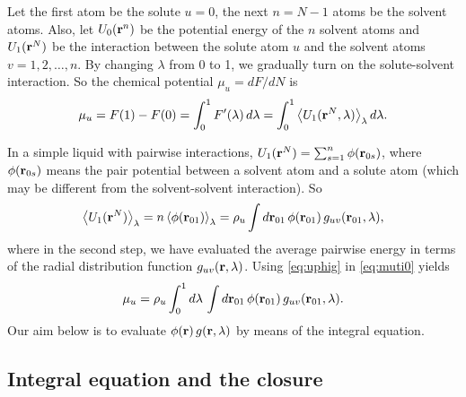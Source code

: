 \documentclass[12pt]{article}
\begin{document}
Let the first atom be the solute $u = 0$,
  the next $n = N - 1$ atoms be the solvent atoms.
Also,
  let $U_0(\mathbf{r}^n)$ be the potential energy of the $n$ solvent atoms
  and $U_1(\mathbf{r}^N)$ be the interaction between the solute atom $u$
  and the solvent atoms $v = 1, 2, \dots, n$.
By changing $\lambda$ from 0 to 1, we gradually turn on
  the solute-solvent interaction.
%
So the chemical potential $\mu_u = dF/dN$ is
\begin{align}
  \mu_u
  =
  F(1) - F(0)
  =
  \int_0^1 F'(\lambda) \, d\lambda
  =
  \int_0^1
    \left\langle
      U_1(\mathbf{r}^N, \lambda)
    \right\rangle_\lambda d\lambda.
  \label{eq:muti0}
\end{align}




In a simple liquid with pairwise interactions,
  $U_1(\mathbf{r}^N) = \sum_{s = 1}^{n} \phi(\mathbf{r}_{0s})$,
  where $\phi(\mathbf{r}_{0s})$ means the pair potential
  between a solvent atom and a solute atom
  (which may be different from the solvent-solvent
  interaction).
So
\begin{equation}
    \left\langle
      U_1(\mathbf{r}^N)
    \right\rangle_\lambda
    =
    n
    \left\langle
      \phi(\mathbf{r}_{01})
    \right\rangle_\lambda
    =
    \rho_u \int d\mathbf{r}_{01} \,
      \phi(\mathbf{r}_{01}) \, g_{uv}(\mathbf{r}_{01}, \lambda),
  \label{eq:uphig}
\end{equation}
%
where in the second step, we have evaluated the average
pairwise energy in terms of the radial distribution function
$g_{uv}(\mathbf{r}, \lambda)$.
Using \eqref{eq:uphig} in \eqref{eq:muti0} yields
\begin{equation}
    \mu_u
    =
    \rho_u
    \int_0^1 d\lambda \,
      \int d\mathbf{r}_{01} \,
        \phi(\mathbf{r}_{01}) \, g_{uv}(\mathbf{r}_{01}, \lambda).
  \label{eq:muti}
\end{equation}
Our aim below is to evaluate
$\phi(\mathbf{r}) \, g(\mathbf{r}, \lambda)$
by means of the integral equation.




\subsection{Integral equation and the closure}
\end{document}

